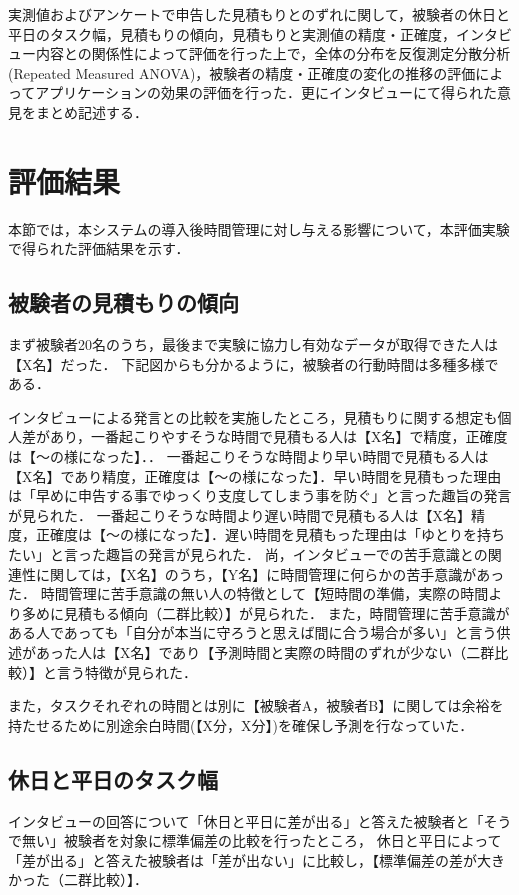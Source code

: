 実測値およびアンケートで申告した見積もりとのずれに関して，被験者の休日と平日のタスク幅，見積もりの傾向，見積もりと実測値の精度・正確度，インタビュー内容との関係性によって評価を行った上で，全体の分布を反復測定分散分析(Repeated Measured ANOVA)，被験者の精度・正確度の変化の推移の評価によってアプリケーションの効果の評価を行った．更にインタビューにて得られた意見をまとめ記述する．

\section{評価結果}
本節では，本システムの導入後時間管理に対し与える影響について，本評価実験で得られた評価結果を示す．

\subsection{被験者の見積もりの傾向}
まず被験者20名のうち，最後まで実験に協力し有効なデータが取得できた人は【X名】だった．
下記図\label{fig:result1}からも分かるように，被験者の行動時間は多種多様である．

インタビューによる発言との比較を実施したところ，見積もりに関する想定も個人差があり，一番起こりやすそうな時間で見積もる人は【X名】で精度，正確度は【〜の様になった】．．
一番起こりそうな時間より早い時間で見積もる人は【X名】であり精度，正確度は【〜の様になった】．早い時間を見積もった理由は「早めに申告する事でゆっくり支度してしまう事を防ぐ」と言った趣旨の発言が見られた．
一番起こりそうな時間より遅い時間で見積もる人は【X名】精度，正確度は【〜の様になった】．遅い時間を見積もった理由は「ゆとりを持ちたい」と言った趣旨の発言が見られた．
尚，インタビューでの苦手意識との関連性に関しては，【X名】のうち，【Y名】に時間管理に何らかの苦手意識があった．
時間管理に苦手意識の無い人の特徴として【短時間の準備，実際の時間より多めに見積もる傾向（二群比較）】が見られた．
また，時間管理に苦手意識がある人であっても「自分が本当に守ろうと思えば間に合う場合が多い」と言う供述があった人は【X名】であり【予測時間と実際の時間のずれが少ない（二群比較）】と言う特徴が見られた．

また，タスクそれぞれの時間とは別に【被験者A，被験者B】に関しては余裕を持たせるために別途余白時間(【X分，X分】)を確保し予測を行なっていた．

\subsection{休日と平日のタスク幅}
インタビューの回答について「休日と平日に差が出る」と答えた被験者と「そうで無い」被験者を対象に標準偏差の比較を行ったところ，
休日と平日によって「差が出る」と答えた被験者は「差が出ない」に比較し，【標準偏差の差が大きかった（二群比較）】．

